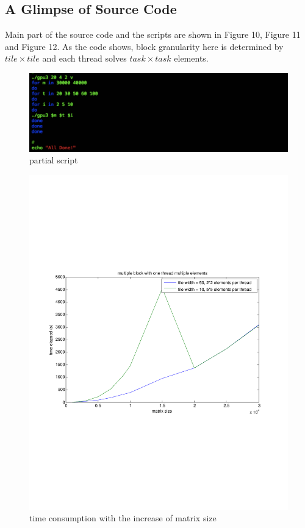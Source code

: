 \documentclass {article}
\begin{document}
\subsection{A Glimpse of Source Code}
Main part of the source code and the scripts are shown in Figure 10, Figure 11 and Figure 12. As the code shows, block granularity here is determined by $tile \times tile$ and each thread solves $task \times task$ elements. 

\begin{figure}[htp!]
\centering
\includegraphics[width = \linewidth]{gpu33.pdf}
\caption{partial script}
\label{fig:gpu33}
\end{figure}

\begin{figure}[htp!]
\centering
\includegraphics[width = 0.8\linewidth]{r_gpu31.pdf}
\caption{time consumption with the increase of matrix size}
\label{fig:rgpu3}
\end{figure}
\end{document}
